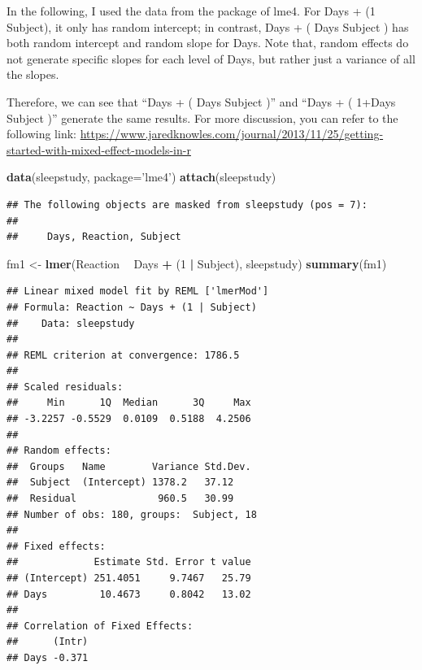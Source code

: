 \documentclass[]{book}
\newenvironment{Shaded}{\begin{snugshade}}{\end{snugshade}}
\newcommand{\KeywordTok}[1]{\textcolor[rgb]{0.13,0.29,0.53}{\textbf{#1}}}
\newcommand{\DataTypeTok}[1]{\textcolor[rgb]{0.13,0.29,0.53}{#1}}
\newcommand{\DecValTok}[1]{\textcolor[rgb]{0.00,0.00,0.81}{#1}}
\newcommand{\StringTok}[1]{\textcolor[rgb]{0.31,0.60,0.02}{#1}}
\newcommand{\OperatorTok}[1]{\textcolor[rgb]{0.81,0.36,0.00}{\textbf{#1}}}
\newcommand{\NormalTok}[1]{#1}
\begin{document}
In the following, I used the data from the package of lme4. For Days +
(1 \textbar{} Subject), it only has random intercept; in contrast, Days
+ ( Days\textbar{} Subject ) has both random intercept and random slope
for Days. Note that, random effects do not generate specific slopes for
each level of Days, but rather just a variance of all the slopes.

Therefore, we can see that ``Days + ( Days\textbar{} Subject )'' and
``Days + ( 1+Days\textbar{} Subject )'' generate the same results. For
more discussion, you can refer to the following link:
\url{https://www.jaredknowles.com/journal/2013/11/25/getting-started-with-mixed-effect-models-in-r}

\begin{Shaded}
\begin{Highlighting}[]
\KeywordTok{data}\NormalTok{(sleepstudy, }\DataTypeTok{package=}\StringTok{'lme4'}\NormalTok{)}
\KeywordTok{attach}\NormalTok{(sleepstudy)}
\end{Highlighting}
\end{Shaded}

\begin{verbatim}
## The following objects are masked from sleepstudy (pos = 7):
## 
##     Days, Reaction, Subject
\end{verbatim}

\begin{Shaded}
\begin{Highlighting}[]
\NormalTok{fm1 <-}\StringTok{ }\KeywordTok{lmer}\NormalTok{(Reaction }\OperatorTok{~}\StringTok{ }\NormalTok{Days }\OperatorTok{+}\StringTok{ }\NormalTok{(}\DecValTok{1} \OperatorTok{|}\StringTok{ }\NormalTok{Subject), sleepstudy)}
\KeywordTok{summary}\NormalTok{(fm1)}
\end{Highlighting}
\end{Shaded}

\begin{verbatim}
## Linear mixed model fit by REML ['lmerMod']
## Formula: Reaction ~ Days + (1 | Subject)
##    Data: sleepstudy
## 
## REML criterion at convergence: 1786.5
## 
## Scaled residuals: 
##     Min      1Q  Median      3Q     Max 
## -3.2257 -0.5529  0.0109  0.5188  4.2506 
## 
## Random effects:
##  Groups   Name        Variance Std.Dev.
##  Subject  (Intercept) 1378.2   37.12   
##  Residual              960.5   30.99   
## Number of obs: 180, groups:  Subject, 18
## 
## Fixed effects:
##             Estimate Std. Error t value
## (Intercept) 251.4051     9.7467   25.79
## Days         10.4673     0.8042   13.02
## 
## Correlation of Fixed Effects:
##      (Intr)
## Days -0.371
\end{verbatim}
\end{document}
